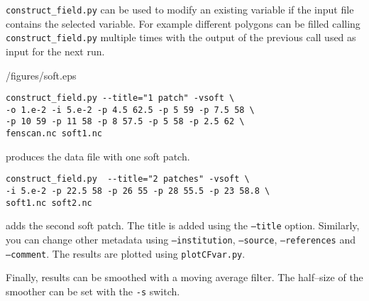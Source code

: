 \texttt{construct\_field.py} can be used to modify an existing variable if the input file contains the selected variable. For example different polygons can be filled calling \texttt{construct\_field.py} multiple times with the output of the previous call used as input for the next run.

\begin{pycf}{}{\dir/figures/soft.eps}
\begin{verbatim}
construct_field.py --title="1 patch" -vsoft \
-o 1.e-2 -i 5.e-2 -p 4.5 62.5 -p 5 59 -p 7.5 58 \
-p 10 59 -p 11 58 -p 8 57.5 -p 5 58 -p 2.5 62 \
fenscan.nc soft1.nc
\end{verbatim}
produces the data file with one soft patch.
\begin{verbatim}
construct_field.py  --title="2 patches" -vsoft \
-i 5.e-2 -p 22.5 58 -p 26 55 -p 28 55.5 -p 23 58.8 \
soft1.nc soft2.nc
\end{verbatim}
adds the second soft patch. The title is added using the \texttt{--title} option. Similarly, you can change other metadata using \texttt{--institution}, \texttt{--source}, \texttt{--references} and \texttt{--comment}. The results are plotted using \texttt{plotCFvar.py}.
\end{pycf}

Finally, results can be smoothed with a moving average filter. The half--size of the smoother can be set with the \texttt{-s} switch.


